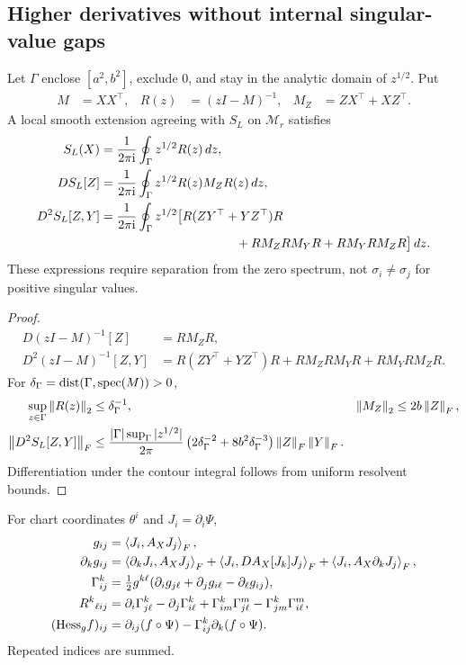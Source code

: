 \subsection{Higher derivatives without internal singular-value gaps}
\begin{proposition}
Let $\Gamma$ enclose $[a^2,b^2]$, exclude $0$, and stay in the analytic
domain of $z^{1/2}$. Put
\begin{align}
M&=XX^\top,&R(z)&=(zI-M)^{-1},&
M_Z&=ZX^\top+XZ^\top .
\end{align}
A local smooth extension agreeing with $S_L$ on $\mathcal M_r$ satisfies
\begin{align}
S_L(X)&=\frac1{2\pi{\rm i}}\oint_\Gamma z^{1/2}R(z)\,dz,\\
DS_L[Z]&=\frac1{2\pi{\rm i}}\oint_\Gamma
z^{1/2}R(z)M_ZR(z)\,dz,\\
D^2S_L[Z,Y]
&=\frac1{2\pi{\rm i}}\oint_\Gamma z^{1/2}
\bigl[R(ZY^\top+YZ^\top)R\notag\\
&\hspace{38mm}+RM_ZRM_YR+RM_YRM_ZR\bigr]\,dz .
\label{eq:rigid-resolvent}
\end{align}
These expressions require separation from the zero spectrum, not
$\sigma_i\ne\sigma_j$ for positive singular values.
\end{proposition}
\begin{proof}
\begin{align}
D(zI-M)^{-1}[Z]&=R M_ZR,\\
D^2(zI-M)^{-1}[Z,Y]
&=R(ZY^\top+YZ^\top)R+RM_ZRM_YR+RM_YRM_ZR .
\end{align}
For $\delta_\Gamma={\rm dist}(\Gamma,{\rm spec}(M))>0$,
\begin{align}
\sup_{z\in\Gamma}\left\lVert R(z)\right\rVert_2&\leq\delta_\Gamma^{-1},&
\left\lVert M_Z\right\rVert_2&\leq2b\left\lVert Z\right\rVert_F,\\
\left\lVert D^2S_L[Z,Y]\right\rVert_F
&\leq\frac{|\Gamma|\sup_\Gamma|z^{1/2}|}{2\pi}
\left(2\delta_\Gamma^{-2}
+8b^2\delta_\Gamma^{-3}\right)\left\lVert Z\right\rVert_F\left\lVert Y\right\rVert_F.
\end{align}
Differentiation under the contour integral follows from uniform resolvent bounds.
\end{proof}

\begin{proposition}
For chart coordinates $\theta^i$ and $J_i=\partial_i\Psi$,
\begin{align}
g_{ij}&=\left\langle J_i,A_XJ_j\right\rangle_F,\\
\partial_k g_{ij}
&=\left\langle\partial_kJ_i,A_XJ_j\right\rangle_F
+\left\langle J_i,DA_X[J_k]J_j\right\rangle_F
+\left\langle J_i,A_X\partial_kJ_j\right\rangle_F,\\
\Gamma^k_{ij}
&=\tfrac12 g^{k\ell}
(\partial_i g_{j\ell}+\partial_j g_{i\ell}-\partial_\ell g_{ij}),\\
R^k{}_{\ell ij}
&=\partial_i\Gamma^k_{j\ell}-\partial_j\Gamma^k_{i\ell}
+\Gamma^k_{im}\Gamma^m_{j\ell}
-\Gamma^k_{jm}\Gamma^m_{i\ell},\\
({\rm Hess}_g f)_{ij}
&=\partial_{ij}(f\circ\Psi)-\Gamma^k_{ij}\partial_k(f\circ\Psi).
\label{eq:rigid-coordinate-curvature}
\end{align}
Repeated indices are summed.
\end{proposition}

